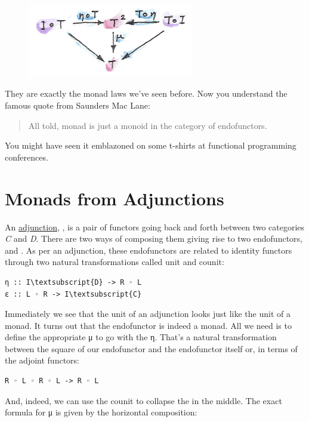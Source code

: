 \begin{figure}[H]
\centering
\includegraphics[width=2.86458in]{images/unitlawcomp.png}
\end{figure}

\noindent
They are exactly the monad laws we've seen before. Now you understand
the famous quote from Saunders Mac Lane:

\begin{quote}
All told, monad is just a monoid in the category of endofunctors.
\end{quote}
You might have seen it emblazoned on some t-shirts at functional
programming conferences.

\section{Monads from Adjunctions}\label{monads-from-adjunctions}

An \hyperref[adjunctions]{adjunction},
, is a pair of functors going back and forth between two
categories \emph{C} and \emph{D}. There are two ways of composing them
giving rise to two endofunctors,  and .
As per an adjunction, these endofunctors are related to identity
functors through two natural transformations called unit and counit:

\begin{Verbatim}[commandchars=\\\{\}]
η :: I\textsubscript{D} -> R ◦ L
ε :: L ◦ R -> I\textsubscript{C}
\end{Verbatim}
Immediately we see that the unit of an adjunction looks just like the
unit of a monad. It turns out that the endofunctor  is
indeed a monad. All we need is to define the appropriate μ to go with
the η. That's a natural transformation between the square of our
endofunctor and the endofunctor itself or, in terms of the adjoint
functors:

\begin{verbatim}
R ◦ L ◦ R ◦ L -> R ◦ L
\end{verbatim}
And, indeed, we can use the counit to collapse the  in
the middle. The exact formula for μ is given by the horizontal
composition:

